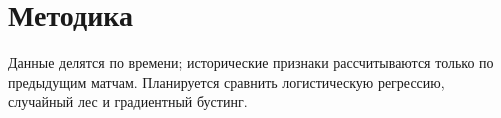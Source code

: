 \section{Методика}
Данные делятся по времени; исторические признаки рассчитываются только по предыдущим матчам. Планируется сравнить логистическую регрессию, случайный лес и градиентный бустинг.
